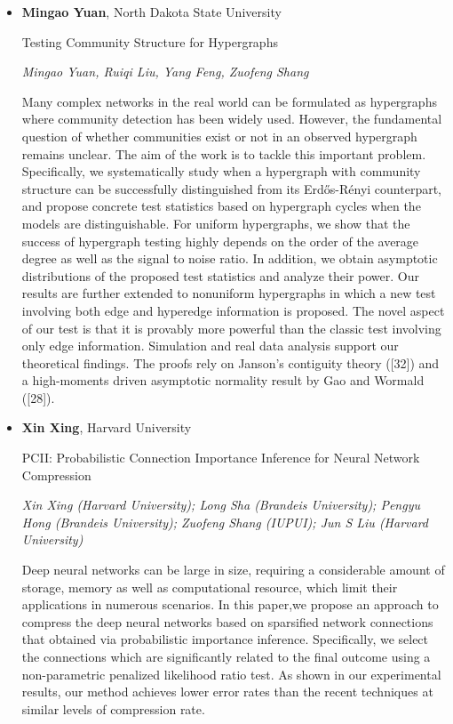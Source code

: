 \begin{itemize}
\item \textbf{Mingao Yuan}, North Dakota State University

Testing Community Structure for Hypergraphs

\emph{\footnotesize Mingao Yuan, Ruiqi Liu, Yang Feng, Zuofeng Shang}

Many complex networks in the real world can be formulated as hypergraphs where community detection has been widely used. However, the fundamental question of whether communities exist or not in an observed hypergraph remains unclear. The aim of the work is to tackle this important problem. Specifically, we systematically study when a hypergraph with community structure can be successfully distinguished from its Erd\H{o}s-R\'enyi counterpart, and propose concrete test statistics based on hypergraph cycles when the models are distinguishable. For uniform hypergraphs, we show that the success of hypergraph testing highly depends on the order of the average degree as well as the signal to noise ratio. In addition, we obtain asymptotic distributions of the proposed test statistics and analyze their power. Our results are further extended to nonuniform hypergraphs in which a new test involving both edge and hyperedge information is proposed. The novel aspect of our test is that it is provably more powerful than the classic test involving only edge information. Simulation and real data analysis support our theoretical findings. The proofs rely on Janson’s contiguity theory ([32]) and a high-moments driven asymptotic normality result by Gao and Wormald ([28]).

\item \textbf{Xin Xing}, Harvard University

PCII: Probabilistic Connection Importance Inference for Neural Network Compression

\emph{\footnotesize Xin Xing (Harvard University); Long Sha (Brandeis University); Pengyu Hong (Brandeis University); Zuofeng Shang (IUPUI); Jun S Liu (Harvard University)}

Deep neural networks can be large in size, requiring a considerable amount of storage, memory as well as computational resource, which limit their applications in numerous scenarios. In this paper,we propose an approach to compress the deep neural networks based on sparsified network connections that obtained via probabilistic importance inference. Specifically, we select the connections which are significantly related to the final outcome using a non-parametric penalized likelihood ratio test.  As shown in our experimental results, our method achieves lower error rates than the recent techniques at similar levels of compression rate.


\end{itemize}

